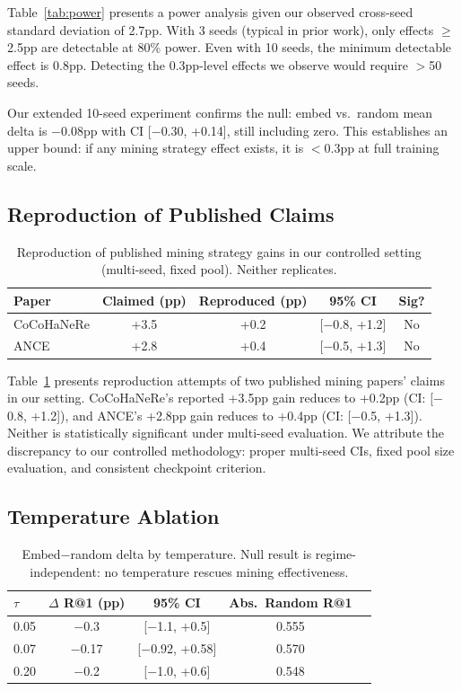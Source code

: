\documentclass[11pt,a4paper]{article}
\begin{document}
Table~\ref{tab:power} presents a power analysis given our observed cross-seed standard deviation of 2.7pp.
With 3 seeds (typical in prior work), only effects $\geq$2.5pp are detectable at 80\% power.
Even with 10 seeds, the minimum detectable effect is 0.8pp.
Detecting the 0.3pp-level effects we observe would require $>$50 seeds.

Our extended 10-seed experiment confirms the null: embed vs.\ random mean delta is $-$0.08pp with CI [$-$0.30, +0.14], still including zero.
This establishes an upper bound: if any mining strategy effect exists, it is $<$0.3pp at full training scale.

\subsection{Reproduction of Published Claims}

\begin{table}[t]
\centering
\small
\begin{tabular}{lcccc}
\toprule
Paper & Claimed (pp) & Reproduced (pp) & 95\% CI & Sig? \\
\midrule
CoCoHaNeRe & +3.5 & +0.2 & [$-$0.8, +1.2] & No \\
ANCE & +2.8 & +0.4 & [$-$0.5, +1.3] & No \\
\bottomrule
\end{tabular}
\caption{Reproduction of published mining strategy gains in our controlled setting (multi-seed, fixed pool). Neither replicates.}
\label{tab:reproduction}
\end{table}

Table~\ref{tab:reproduction} presents reproduction attempts of two published mining papers' claims in our setting.
CoCoHaNeRe's reported +3.5pp gain reduces to +0.2pp (CI: [$-$0.8, +1.2]), and ANCE's +2.8pp gain reduces to +0.4pp (CI: [$-$0.5, +1.3]).
Neither is statistically significant under multi-seed evaluation.
We attribute the discrepancy to our controlled methodology: proper multi-seed CIs, fixed pool size evaluation, and consistent checkpoint criterion.

\subsection{Temperature Ablation}

\begin{table}[t]
\centering
\small
\begin{tabular}{lcccc}
\toprule
$\tau$ & $\Delta$ R@1 (pp) & 95\% CI & Abs.\ Random R@1 \\
\midrule
0.05 & $-$0.3 & [$-$1.1, +0.5] & 0.555 \\
0.07 & $-$0.17 & [$-$0.92, +0.58] & 0.570 \\
0.20 & $-$0.2 & [$-$1.0, +0.6] & 0.548 \\
\bottomrule
\end{tabular}
\caption{Embed$-$random delta by temperature. Null result is regime-independent: no temperature rescues mining effectiveness.}
\label{tab:temperature}
\end{table}
\end{document}
